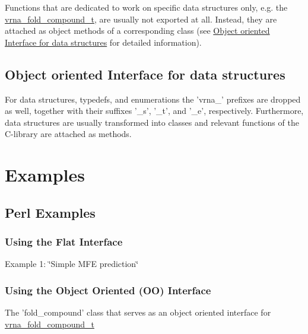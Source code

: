 Functions that are dedicated to work on specific data structures only, e.\-g. the \hyperlink{group__fold__compound_ga1b0cef17fd40466cef5968eaeeff6166}{vrna\-\_\-fold\-\_\-compound\-\_\-t}, are usually not exported at all. Instead, they are attached as object methods of a corresponding class (see \hyperlink{swig_interface_swig_oo_interface}{Object oriented Interface for data structures} for detailed information).\hypertarget{swig_interface_swig_oo_interface}{}\subsection{Object oriented Interface for data structures}\label{swig_interface_swig_oo_interface}
For data structures, typedefs, and enumerations the 'vrna\-\_\-' prefixes are dropped as well, together with their suffixes '\-\_\-s', '\-\_\-t', and '\-\_\-e', respectively. Furthermore, data structures are usually transformed into classes and relevant functions of the C-\/library are attached as methods.\hypertarget{swig_interface_swig_examples}{}\section{Examples}\label{swig_interface_swig_examples}
\hypertarget{swig_interface_swig_perl_examples}{}\subsection{Perl Examples}\label{swig_interface_swig_perl_examples}
\hypertarget{swig_interface_swig_perl_examples_flat}{}\subsubsection{Using the Flat Interface}\label{swig_interface_swig_perl_examples_flat}
Example 1\-: \char`\"{}\-Simple M\-F\-E prediction\char`\"{} 
\hypertarget{swig_interface_swig_perl_examples_oo}{}\subsubsection{Using the Object Oriented (\-O\-O) Interface}\label{swig_interface_swig_perl_examples_oo}
The 'fold\-\_\-compound' class that serves as an object oriented interface for \hyperlink{group__fold__compound_ga1b0cef17fd40466cef5968eaeeff6166}{vrna\-\_\-fold\-\_\-compound\-\_\-t}

